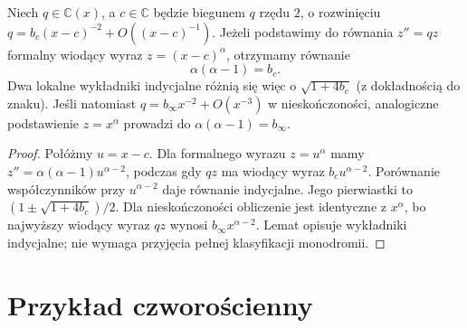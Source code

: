 \begin{lemat}
\label{aa:lem:kov3-exponents}
Niech $q\in\mathbb C(x)$,
a $c\in\mathbb C$ będzie
biegunem $q$ rzędu $2$,
o rozwinięciu
$q=b_c(x-c)^{-2}
+O((x-c)^{-1})$.
Jeżeli podstawimy
do równania $z''=qz$
formalny wiodący wyraz
$z=(x-c)^\alpha$,
otrzymamy równanie
\[
 \alpha(\alpha-1)=b_c.
\]
Dwa lokalne wykładniki
indycjalne różnią się więc
o $\sqrt{1+4b_c}$
(z dokładnością do znaku).
Jeśli natomiast
$q=b_\infty x^{-2}
+O(x^{-3})$ w nieskończoności,
analogiczne podstawienie
$z=x^\alpha$ prowadzi
do $\alpha(\alpha-1)=b_\infty$.
\end{lemat}
\begin{proof}
Połóżmy $u=x-c$.
Dla formalnego wyrazu
$z=u^\alpha$ mamy
$z''=\alpha(\alpha-1)u^{\alpha-2}$,
podczas gdy $qz$
ma wiodący wyraz
$b_cu^{\alpha-2}$.
Porównanie współczynników
przy $u^{\alpha-2}$
daje równanie indycjalne.
Jego pierwiastki to
$(1\pm\sqrt{1+4b_c})/2$.
Dla nieskończoności
obliczenie jest identyczne
z $x^\alpha$,
bo najwyższy wiodący wyraz
$qz$ wynosi
$b_\infty x^{\alpha-2}$.
Lemat opisuje wykładniki
indycjalne; nie wymaga
przyjęcia pełnej klasyfikacji
monodromii.
\end{proof}

\section{Przykład czworościenny}

